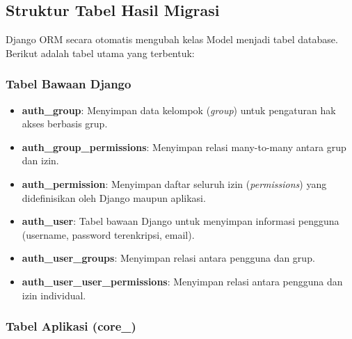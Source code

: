 \subsection{Struktur Tabel Hasil Migrasi}
Django ORM secara otomatis mengubah kelas Model menjadi tabel database. Berikut adalah tabel utama yang terbentuk:
\subsubsection*{Tabel Bawaan Django}

\begin{itemize}
    \item \textbf{auth\_group}: Menyimpan data kelompok (\textit{group}) untuk pengaturan hak akses berbasis grup.
    \item \textbf{auth\_group\_permissions}: Menyimpan relasi many-to-many antara grup dan izin.
    \item \textbf{auth\_permission}: Menyimpan daftar seluruh izin (\textit{permissions}) yang didefinisikan oleh Django maupun aplikasi.
    \item \textbf{auth\_user}: Tabel bawaan Django untuk menyimpan informasi pengguna (username, password terenkripsi, email).
    \item \textbf{auth\_user\_groups}: Menyimpan relasi antara pengguna dan grup.
    \item \textbf{auth\_user\_user\_permissions}: Menyimpan relasi antara pengguna dan izin individual.
\end{itemize}

\subsubsection*{Tabel Aplikasi (core\_)}

